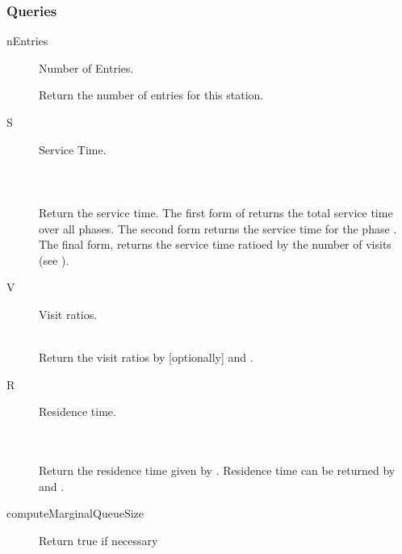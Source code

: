\subsubsection{Queries}
\begin{description}
\item[nEntries] \texonly{---} Number of Entries.\\

  Return the number of entries for this station.

\item[S] \texonly{---} Service Time.\\
  \\
  \\
  \\

  Return the service time.  The first form of  returns the
  total service time over all phases.  The second form returns the
  service time for the phase .  The final form, 
  returns the service time ratioed by the number of visits (see
  ).

\item[V] \texonly{---} Visit ratios.\\
  \\

  Return the visit ratios by [optionally]  and .

\item[R] \texonly{---} Residence time.\\
  \\
  \\

  Return the residence time given by .  Residence time can be returned by  and
  .  

\item[computeMarginalQueueSize] \texonly{---} Return true if necessary\\


\end{description}
